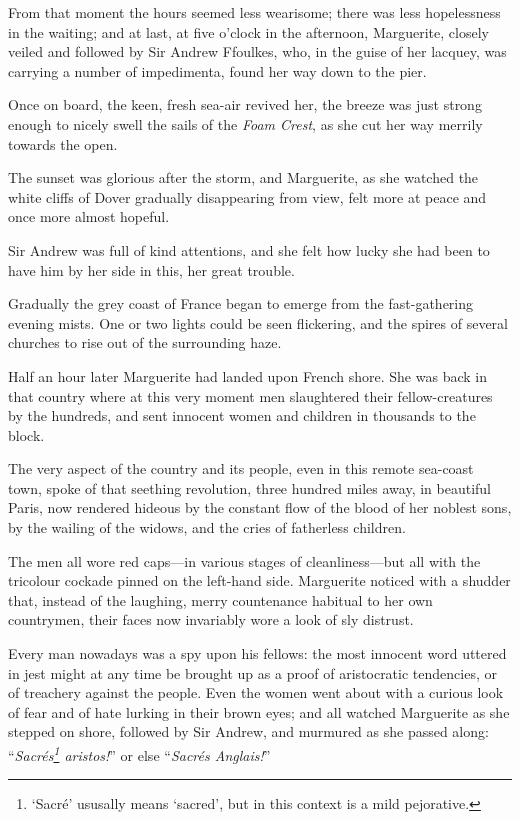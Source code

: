 \documentclass[paper=a5,BCOR=7mm,twoside,DIV=calc,12pt,usegeometry,chapterprefix,endperiod,headings=big]{scrbook}
\begin{document}
From that moment the hours seemed less wearisome; there was less hopelessness in the waiting; and at last, at five o'clock in the afternoon, Marguerite, closely veiled and followed by Sir Andrew Ffoulkes, who, in the guise of her lacquey, was carrying a number of impedimenta, found her way down to the pier.

Once on board, the keen, fresh sea-air revived her, the breeze was just strong enough to nicely swell the sails of the \textit{Foam Crest}, as she cut her way merrily towards the open.

The sunset was glorious after the storm, and Marguerite, as she watched the white cliffs of Dover gradually disappearing from view, felt more at peace and once more almost hopeful.

Sir Andrew was full of kind attentions, and she felt how lucky she had been to have him by her side in this, her great trouble.

Gradually the grey coast of France began to emerge from the fast-gathering evening mists. One or two lights could be seen flickering, and the spires of several churches to rise out of the surrounding haze.

Half an hour later Marguerite had landed upon French shore. She was back in that country where at this very moment men slaughtered their fellow-creatures by the hundreds, and sent innocent women and children in thousands to the block.

The very aspect of the country and its people, even in this remote sea-coast town, spoke of that seething revolution, three hundred miles away, in beautiful Paris, now rendered hideous by the constant flow of the blood of her noblest sons, by the wailing of the widows, and the cries of fatherless children.

The men all wore red caps---in various stages of  cleanliness---but all with the tricolour cockade pinned on the left-hand side. Marguerite noticed with a shudder that, instead of the laughing, merry countenance habitual to her own countrymen, their faces now invariably wore a look of sly distrust.

Every man nowadays was a spy upon his fellows: the most innocent word uttered in jest might at any time be brought up as a proof of aristocratic tendencies, or of treachery against the people. Even the women went about with a curious look of fear and of hate lurking in their brown eyes; and all watched Marguerite as she stepped on shore, followed by Sir Andrew, and murmured as she passed along: \enquote{\textit{Sacrés\footnote{\enquote{Sacré} ususally means \enquote{sacred}, but in this context is a mild pejorative.} aristos!}} or else \enquote{\textit{Sacrés Anglais!}}
\end{document}
